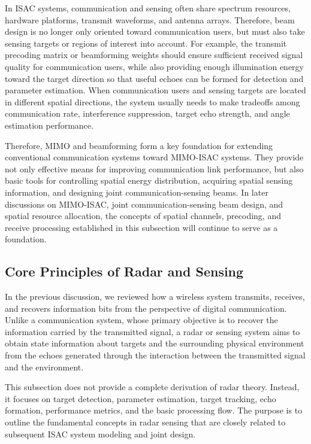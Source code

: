 In ISAC systems,
communication and sensing often share spectrum resources,
hardware platforms,
transmit waveforms,
and antenna arrays.
Therefore,
beam design is no longer only oriented toward communication users,
but must also take sensing targets or regions of interest into account.
For example,
the transmit precoding matrix or beamforming weights should ensure sufficient received signal quality
for communication users,
while also providing enough illumination energy toward the target direction
so that useful echoes can be formed for detection and parameter estimation.
When communication users and sensing targets are located in different spatial directions,
the system usually needs to make tradeoffs among communication rate,
interference suppression,
target echo strength,
and angle estimation performance.

Therefore,
MIMO and beamforming form a key foundation
for extending conventional communication systems toward MIMO-ISAC systems.
They provide not only effective means for improving communication link performance,
but also basic tools for controlling spatial energy distribution,
acquiring spatial sensing information,
and designing joint communication-sensing beams.
In later discussions on MIMO-ISAC,
joint communication-sensing beam design,
and spatial resource allocation,
the concepts of spatial channels,
precoding,
and receive processing established in this subsection
will continue to serve as a foundation.

\subsection{Core Principles of Radar and Sensing}

In the previous discussion, we reviewed how a wireless system transmits,
receives, and recovers information bits from the perspective of digital
communication.
Unlike a communication system, whose primary objective is to recover the
information carried by the transmitted signal, a radar or sensing system aims
to obtain state information about targets and the surrounding physical
environment from the echoes generated through the interaction between the
transmitted signal and the environment.

This subsection does not provide a complete derivation of radar theory.
Instead, it focuses on target detection, parameter estimation, target tracking,
echo formation, performance metrics, and the basic processing flow.
The purpose is to outline the fundamental concepts in radar sensing that are
closely related to subsequent ISAC system modeling and joint design.

